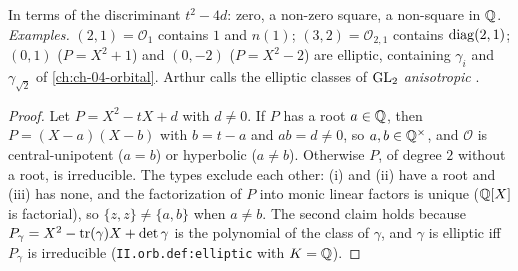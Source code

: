 \begin{definition}
\end{definition}
\noindent In terms of the discriminant $t^2-4d$: zero, a non-zero square, a non-square in $\mathbb{Q}$. \emph{Examples.} $(2,1)=\mathcal O_1$ contains $1$ and
$n(1)$; $(3,2)=\mathcal O_{2,1}$ contains $\operatorname{diag}(2,1)$; $(0,1)$ ($P=X^2+1$) and $(0,-2)$ ($P=X^2-2$) are elliptic, containing $\gamma_i$ and $\gamma_{\sqrt2}$ of
\cref{ch:ch-04-orbital}. Arthur calls the elliptic classes of $\mathrm{GL}_2$ \emph{anisotropic} \cite[§10, p.~53]{AIntro}.

\begin{theorem}[trichotomy]
\end{theorem}
\begin{proof}
Let $P=X^2-tX+d$ with $d\neq0$. If $P$ has a root $a\in\mathbb{Q}$, then $P=(X-a)(X-b)$ with $b=t-a$ and $ab=d\neq0$, so $a,b\in\mathbb{Q}^\times$, and $\mathcal O$ is
central-unipotent ($a=b$) or hyperbolic ($a\neq b$). Otherwise $P$, of degree $2$ without a root, is irreducible. The types exclude each other: (i) and
(ii) have a root and (iii) has none, and the factorization of $P$ into monic linear factors is unique ($\mathbb{Q}[X]$ is factorial), so $\{z,z\}\neq\{a,b\}$ when
$a\neq b$. The second claim holds because $P_\gamma=X^2-\operatorname{tr}(\gamma)X+\det\gamma$ is the polynomial of the class of $\gamma$, and $\gamma$ is elliptic iff $P_\gamma$ is
irreducible (\texttt{II.orb.def:elliptic} with $K=\mathbb{Q}$).
\end{proof}

